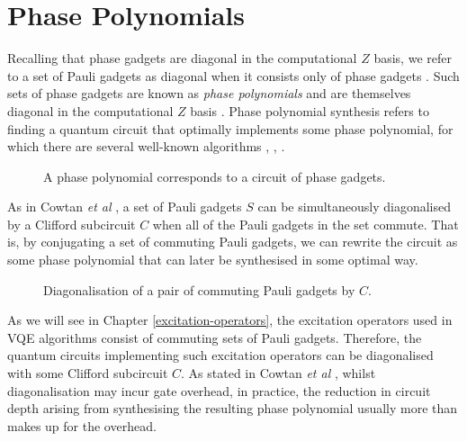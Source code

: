 \section{Phase Polynomials}%
\label{phase-polynomials}

Recalling that phase gadgets are diagonal in the computational $Z$ basis, we refer to a set of Pauli gadgets as diagonal when it consists only of phase gadgets \cite{Cowtan2020}. Such sets of phase gadgets are known as \textit{phase polynomials} and are themselves diagonal in the computational $Z$ basis \cite{Cowtan2019}. Phase polynomial synthesis refers to finding a quantum circuit that optimally implements some phase polynomial, for which there are several well-known algorithms \cite{Amy2013}, \cite{Amy2014}, \cite{Nam2018}.

\begin{figure}[H]
    \centering
    \caption{A phase polynomial corresponds to a circuit of phase gadgets.}
\end{figure}

As in Cowtan \textit{et al} \cite{Cowtan2020}, a set of Pauli gadgets $S$ can be simultaneously diagonalised by a Clifford subcircuit $C$ when all of the Pauli gadgets in the set commute. That is, by conjugating a set of commuting Pauli gadgets, we can rewrite the circuit as some phase polynomial that can later be synthesised in some optimal way.

\begin{figure}[H]
    \centering
    \caption{Diagonalisation of a pair of commuting Pauli gadgets by $C$.}
\end{figure}

As we will see in Chapter \ref{excitation-operators}, the excitation operators used in VQE algorithms consist of commuting sets of Pauli gadgets. Therefore, the quantum circuits implementing such excitation operators can be diagonalised with some Clifford subcircuit $C$. As stated in Cowtan \textit{et al} \cite{Cowtan2020}, whilst diagonalisation may incur gate overhead, in practice, the reduction in circuit depth arising from synthesising the resulting phase polynomial usually more than makes up for the overhead.
